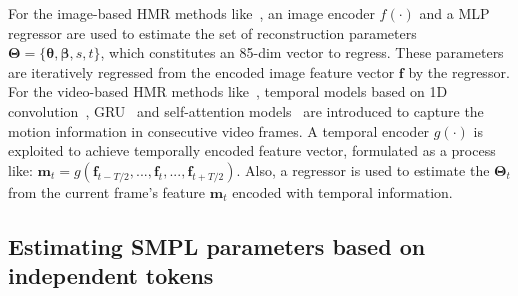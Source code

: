 For the image-based HMR methods like~\citep{hmr:kanazawa2018end,spin:kolotouros2019learning}, an image encoder $f(\cdot)$ and a MLP regressor are used to estimate the set of reconstruction parameters $\boldsymbol{\Theta}=\{\boldsymbol{\theta}, \boldsymbol{\beta}, s, t\}$, which constitutes an 85-dim vector to regress. These parameters are iteratively regressed from the encoded image feature vector $\boldsymbol{f}$ by the regressor. 
For the video-based HMR methods like~\citep{vibe:kocabas2020vibe,tcmr:choi2021beyond,hmmr:kanazawa2019learning,maed:wan2021encoder,mps-net:wei2022capturing}, temporal models based on 1D convolution~\citep{hmmr:kanazawa2019learning}, GRU~\citep{tcmr:choi2021beyond} and self-attention models~\citep{vibe:kocabas2020vibe,maed:wan2021encoder} are introduced to capture the motion information in consecutive video frames. A temporal encoder $g(\cdot)$ is exploited to achieve temporally encoded feature vector, formulated as a process like: $\boldsymbol{m}_t=g(\boldsymbol{f}_{t-T/2}, ..., \boldsymbol{f}_{t},...,\boldsymbol{f}_{t+T/2})$. Also, a regressor is used to estimate the $\boldsymbol{\Theta}_t$ from the current frame's feature $\boldsymbol{m}_t$ encoded with temporal information. 


\subsection{Estimating SMPL parameters based on independent tokens}

%


